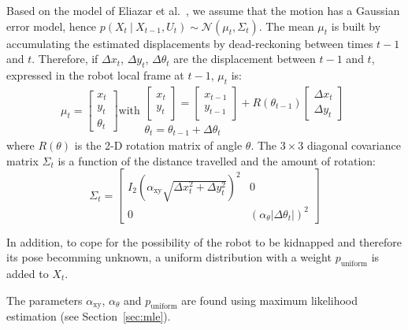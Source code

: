 \documentclass[letterpaper, 10pt, conference]{ieeeconf}
\newcommand{\sect}[1]{Section~\ref{sec:#1}}
\begin{document}
Based on the model of Eliazar et al.~\cite{eliazar2004motionmodel}, we assume that the motion has a Gaussian error model, hence $p(X_t~|~X_{t-1}, U_{t})\sim\mathcal{N}(\mu_t,\Sigma_t)$.
The mean $\mu_t$ is built by accumulating the estimated displacements by dead-reckoning between times $t-1$ and $t$.
Therefore, if $\Delta x_t$, $\Delta y_t$, $\Delta \theta_t$ are the displacement between $t-1$ and $t$, expressed in the robot local frame at $t-1$, $\mu_t$ is:
\begin{equation}
\mu_t =
\left[ \begin{array}{c} x_t \\ y_t \\ \theta_t \end{array} \right]
\text{with}
\begin{array}{c}
\left[ \begin{array}{c} x_t \\ y_t \end{array} \right] =
\left[ \begin{array}{c} x_{t-1} \\ y_{t-1} \end{array} \right] +
R(\theta_{t-1})
\left[ \begin{array}{c} \Delta x_{t} \\ \Delta y_{t} \end{array} \right]
\\
\theta_t = \theta_{t-1} + \Delta \theta_t
\end{array}
\end{equation}
where $R(\theta)$ is the 2-D rotation matrix of angle $\theta$.
The $3\times3$ diagonal covariance matrix $\Sigma_t$ is a function of the distance travelled and the amount of rotation:
\begin{equation}
\Sigma_t=\begin{bmatrix} I_2 ( \alpha_\mathrm{xy} \sqrt{\Delta x_{t}^2 + \Delta y_{t}^2})^2  & 0 \\ 0 & (\alpha_\theta | \Delta \theta_t |)^2 \end{bmatrix}
\end{equation}

In addition, to cope for the possibility of the robot to be kidnapped and therefore its pose becomming unknown, a uniform distribution with a weight $p_\mathrm{uniform}$ is added to $X_t$.

The parameters $\alpha_\mathrm{xy}$, $\alpha_\theta$ and $p_\mathrm{uniform}$ are found using maximum likelihood estimation (see \sect{mle}).
\end{document}
